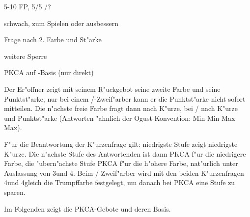 \bdsc
\item[2\coe] 5-10 FP, 5/5 \co/?
  \bdsc
  \item[2\pik] schwach, zum Spielen oder ausbessern
  \item[2\SA] Frage nach 2. Farbe und St"arke
  \item[3\coe] weitere Sperre
  \item[4\tre] PKCA auf \co-Basis (nur direkt)
  \edsc
\edsc


Der Er"offner zeigt mit seinem R"uckgebot seine zweite Farbe und seine
Punktst"arke, nur bei einem \co/\tr-Zweif"arber kann er die Punktst"arke nicht
sofort mitteilen. Die n"achste freie Farbe fragt dann nach K"urze, bei \co/\tr
nach K"urze und Punktst"arke (Antworten "ahnlich der Ogust-Konvention: Min Min
Max Max).

F"ur die Beantwortung der K"urzenfrage gilt: niedrigste Stufe zeigt niedrigste
K"urze. Die n"achste Stufe des Antwortenden ist dann PKCA f"ur die niedrigere
Farbe, die "ubern"achste Stufe PKCA f"ur die h"ohere Farbe, nat"urlich unter
Auslassung von 3\SA und 4\coe. Beim \co/\pi-Zweif"arber wird mit den beiden
K"urzenfragen 4\tre und 4\kar gleich die Trumpffarbe festgelegt, um danach bei
PKCA eine Stufe zu sparen.

Im Folgenden zeigt \ra die PKCA-Gebote und deren Basis.

